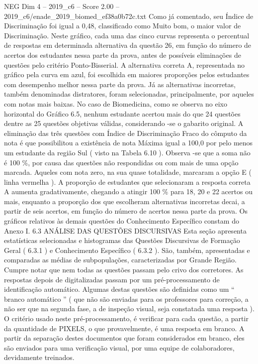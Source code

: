 \begin{textsample}{NEG Dim 4 – 2019\_c6 – Score 2.00 – 2019\_c6/enade\_2019\_biomed\_ef38a0b72c.txt}
Como já comentado, seu Índice de Discriminação foi igual a 0,48, classificado como Muito bom, o maior valor de Discriminação.
Neste gráfico, cada uma das cinco curvas representa o percentual de respostas em determinada alternativa da questão 26, em função do número de acertos dos estudantes nessa parte da prova, antes de possíveis eliminações de questões pelo critério Ponto-Bisserial.
A alternativa correta A, representada no gráfico pela curva em azul, foi escolhida em maiores proporções pelos estudantes com desempenho melhor nessa parte da prova.
Já as alternativas incorretas, também denominadas distratores, foram selecionadas, principalmente, por aqueles com notas mais baixas.
No caso de Biomedicina, como se observa no eixo horizontal do Gráfico 6.5, nenhum estudante acertou mais do que 24 questões dentre as 25 questões objetivas válidas, considerando -se o gabarito original.
A eliminação das três questões com Índice de Discriminação Fraco do cômputo da nota é que possibilitou a existência de nota Máxima igual a 100,0 por pelo menos um estudante da região Sul ( visto na Tabela 6.10 ).
Observa -se que a soma não é 100 \%, por causa das questões não respondidas ou com mais de uma opção marcada.
Aqueles com nota zero, na sua quase totalidade, marcaram a opção E ( linha vermelha ).
A proporção de estudantes que selecionaram a resposta correta A aumenta gradativamente, chegando a atingir 100 \% para 18, 20 e 22 acertos ou mais, enquanto a proporção dos que escolheram alternativas incorretas decai, a partir de seis acertos, em função do número de acertos nessa parte da prova.
Os gráficos relativos às demais questões do Conhecimento Específico constam do Anexo I. 6.3 ANÁLISE DAS QUESTÕES DISCURSIVAS Esta seção apresenta estatísticas selecionadas e histogramas das Questões Discursivas de Formação Geral ( 6.3.1 ) e Conhecimento Específico ( 6.3.2 ).
São, também, apresentadas e comparadas as médias de subpopulações, caracterizadas por Grande Região.
Cumpre notar que nem todas as questões passam pelo crivo dos corretores.
As respostas depois de digitalizadas passam por um pré-processamento de identificação automático.
Algumas destas questões são definidas como um “ branco automático ” ( que não são enviadas para os professores para correção, a não ser que na segunda fase, a de inspeção visual, seja constatada uma resposta ).
O critério usado neste pré-processamento, é verificar para cada questão, a partir da quantidade de PIXELS, o que provavelmente, é uma resposta em branco.
A partir da separação destes documentos que foram considerados em branco, eles são enviados para uma verificação visual, por uma equipe de colaboradores, devidamente treinados.

\end{textsample}
